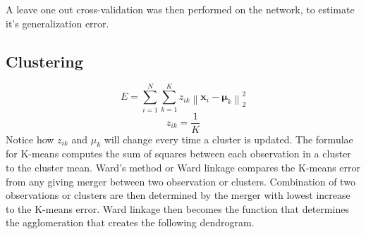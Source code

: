 \documentclass{article}
\begin{document}
\noindent A leave one out cross-validation was then performed on the network, to estimate it's generalization error.

\subsection{Clustering}


\begin{equation}
E=\sum_{i=1}^{N} \sum_{k=1}^{K} z_{i k}\left\|\boldsymbol{x}_{i}-\boldsymbol{\mu}_{k}\right\|_{2}^{2}
\end{equation}
\begin{equation}
z_{i k} = \frac{1}{K}
\end{equation}
Notice how $z_{ik}$ and $\mu_{k}$ will change every time a cluster is updated.
The formulae for K-means computes the sum of squares between each observation in a cluster to the cluster mean.
Ward's method or Ward linkage compares the K-means error from any giving merger between two observation or clusters. Combination of two observations or clusters are then determined by the merger with lowest increase to the K-means error.
Ward linkage then becomes the function that determines the agglomeration that creates the following dendrogram.




\end{document}
